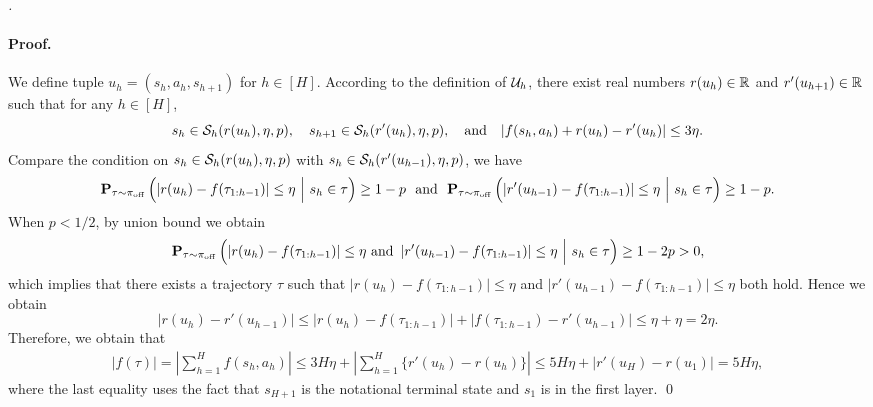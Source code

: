\documentclass{article}
\let\oldparagraph\paragraph
\renewcommand{\paragraph}[1]{\oldparagraph{#1.}}
\begin{document}
\begin{proof}[]
    \paragraph{Proof} We define tuple $u_h = (s_h, a_h, s_{h+1})$ for $h\in [H]$. According to the definition of $\mathcal{U}_h$, there exist real numbers $r(u_h)\in \mathbb{R}$ and $r'(u_{h+1})\in \mathbb{R}$ such that for any $h\in [H]$,
    \[s_h\in \mathcal{S}_h(r(u_h), \eta, p),\quad s_{h+1}\in \mathcal{S}_h(r'(u_h), \eta, p),\quad \text{and}\quad |f(s_h, a_h) + r(u_h) - r'(u_h)|\le 3\eta.\]
    Compare the condition on $s_h\in \mathcal{S}_h(r(u_h), \eta, p)$ with $s_h\in \mathcal{S}_h(r'(u_{h-1}), \eta, p)$, we have
    \[\bP_{\tau\sim \pioff}\left(\left|r(u_h) - f(\tau_{1:h-1})\right|\le \eta \ \Big{|}\ s_h\in \tau\right)\ge 1 - p\ \text{ and }\ \bP_{\tau\sim \pioff}\left(\left|r'(u_{h-1}) - f(\tau_{1:h-1})\right|\le \eta \ \Big{|}\ s_h\in \tau\right)\ge 1 - p.\]
    When $p < 1/2$, by union bound we obtain 
    $$\mathbf{P}_{\tau\sim \pi_{\mathrm{off}}}\left(\left|r(u_h) - f(\tau_{1:h-1})\right|\le \eta \text{ and }\left|r'(u_{h-1}) - f(\tau_{1:h-1})\right|\le \eta\ \Big{|}\ s_h\in \tau\right)\ge 1 - 2p > 0,$$
    which implies that there exists a trajectory $\tau$ such that $\left|r(u_h) - f(\tau_{1:h-1})\right|\le \eta$ and $\left|r'(u_{h-1}) - f(\tau_{1:h-1})\right|\le \eta$ both hold. Hence we obtain
    \[|r(u_h) - r'(u_{h-1})|\le |r(u_h) - f(\tau_{1:h-1})| + |f(\tau_{1:h-1}) - r'(u_{h-1})|\le \eta + \eta = 2\eta.\]
    Therefore, we obtain that 
    \begin{align*}
        |f(\tau)| = \left|\sum_{h=1}^H f(s_h, a_h)\right|\le 3H\eta + \left|\sum_{h=1}^H \{r'(u_h) - r(u_h)\}\right|\le 5H\eta + |r'(u_H) - r(u_1)| = 5H\eta,
    \end{align*}
    where the last equality uses the fact that $s_{H+1}$ is the notational terminal state and $s_1$ is in the first layer. \qed


\end{proof}
\end{document}
